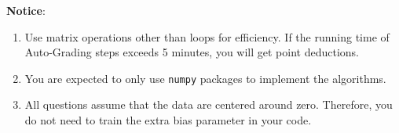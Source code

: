 \documentclass[a4paper, 12pt]{exam}
\begin{document}
	
	\nocite{*}
	\begin{flushleft}
		\textbf{Notice}: \\
		\begin{enumerate}
			\item Use matrix operations other than loops for efficiency. If the running time of Auto-Grading steps exceeds 5 minutes, you will get point deductions.
			\item You are expected to only use \texttt{numpy} packages to implement the algorithms.
			\item All questions assume that the data are centered around zero. Therefore, you do not need to train the extra bias parameter in your code.
		\end{enumerate}
	\end{flushleft}
	
\end{document}
